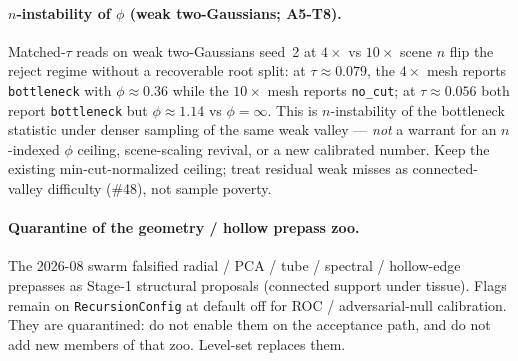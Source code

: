 \documentclass[11pt]{article}
\begin{document}
\paragraph{$n$-instability of $\phi$ (weak two-Gaussians; A5-T8).}
Matched-$\tau$ reads on weak two-Gaussians seed~2 at $4\times$ vs
$10\times$ scene $n$ flip the reject regime without a recoverable
root split: at $\tau\!\approx\!0.079$, the $4\times$ mesh reports
\texttt{bottleneck} with $\phi\!\approx\!0.36$ while the $10\times$
mesh reports \texttt{no\_cut}; at $\tau\!\approx\!0.056$ both report
\texttt{bottleneck} but $\phi\!\approx\!1.14$ vs $\phi{=}\infty$.
This is $n$-instability of the bottleneck statistic under denser
sampling of the same weak valley --- \emph{not} a warrant for an
$n$-indexed $\phi$ ceiling, scene-scaling revival, or a new calibrated
number. Keep the existing min-cut-normalized ceiling; treat residual
weak misses as connected-valley difficulty (\#48), not sample poverty.

\paragraph{Quarantine of the geometry / hollow prepass zoo.}
The 2026-08 swarm falsified radial / PCA / tube / spectral / hollow-edge
prepasses as Stage-1 structural proposals (connected support under
tissue). Flags remain on \texttt{RecursionConfig} at default off for
ROC / adversarial-null calibration. They are quarantined: do not enable
them on the acceptance path, and do not add new members of that zoo.
Level-set replaces them.
\end{document}
